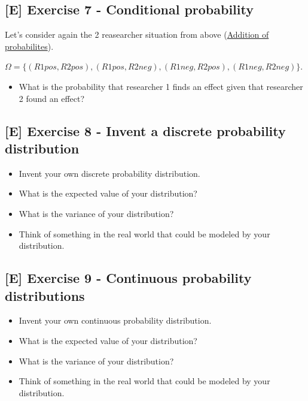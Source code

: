 \documentclass[
]{book}
\providecommand{\tightlist}{%
  \setlength{\itemsep}{0pt}\setlength{\parskip}{0pt}}
\begin{document}
\subsection{{[}E{]} Exercise 7 - Conditional probability}\label{exercise7}

Let's consider again the 2 reasearcher situation from above (\hyperref[addition_of_probabilities]{Addition of probabilites}).

\(\Omega = \{ (R1pos, R2pos), (R1pos, R2neg), (R1neg, R2pos), (R1neg, R2neg) \}\).

\begin{itemize}
\tightlist
\item
  What is the probability that researcher 1 finds an effect given that researcher 2 found an effect?
\end{itemize}

\subsection{{[}E{]} Exercise 8 - Invent a discrete probability distribution}\label{exercise8}

\begin{itemize}
\tightlist
\item
  Invent your own discrete probability distribution.
\item
  What is the expected value of your distribution?
\item
  What is the variance of your distribution?
\item
  Think of something in the real world that could be modeled by your distribution.
\end{itemize}

\subsection{{[}E{]} Exercise 9 - Continuous probability distributions}\label{exercise9}

\begin{itemize}
\tightlist
\item
  Invent your own continuous probability distribution.
\item
  What is the expected value of your distribution?
\item
  What is the variance of your distribution?
\item
  Think of something in the real world that could be modeled by your distribution.
\end{itemize}
\end{document}
